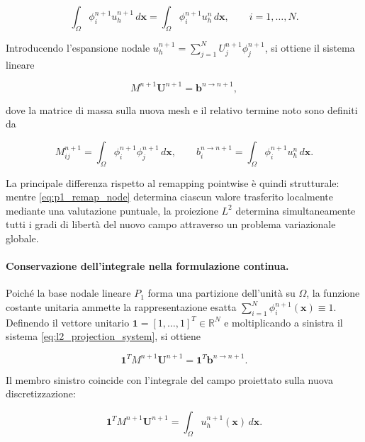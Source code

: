 \begin{equation}
\int_{\Omega}
\phi_i^{n+1}
u_h^{n+1}
\,d\mathbf{x}
=
\int_{\Omega}
\phi_i^{n+1}
u_h^n
\,d\mathbf{x},
\qquad
i=1,\ldots,N.
\label{eq:l2_projection_weak}
\end{equation}

Introducendo l'espansione nodale $u_h^{n+1} = \sum_{j=1}^{N} U_j^{n+1}\phi_j^{n+1}$, si ottiene il sistema lineare

\begin{equation}
M^{n+1}\mathbf{U}^{n+1}
=
\mathbf{b}^{n\rightarrow n+1},
\label{eq:l2_projection_system}
\end{equation}

dove la matrice di massa sulla nuova mesh e il relativo termine noto sono definiti da

\begin{equation}
M_{ij}^{n+1}
=
\int_{\Omega}
\phi_i^{n+1}
\phi_j^{n+1}
\,d\mathbf{x},
\qquad
b_i^{n\rightarrow n+1}
=
\int_{\Omega}
\phi_i^{n+1}
u_h^n
\,d\mathbf{x}.
\label{eq:l2_mass_matrix}
\end{equation}

La principale differenza rispetto al remapping pointwise è quindi strutturale: mentre \eqref{eq:p1_remap_node} determina ciascun valore trasferito localmente mediante una valutazione puntuale, la proiezione $L^2$ determina simultaneamente tutti i gradi di libertà del nuovo campo attraverso un problema variazionale globale.

\paragraph{Conservazione dell'integrale nella formulazione continua.}

Poiché la base nodale lineare $P_1$ forma una partizione dell'unità su $\Omega$, la funzione costante unitaria ammette la rappresentazione esatta $\sum_{i=1}^N \phi_i^{n+1}(\mathbf{x}) \equiv 1$. Definendo il vettore unitario $\mathbf{1}=[1,\ldots,1]^T\in\mathbb{R}^{N}$ e moltiplicando a sinistra il sistema \eqref{eq:l2_projection_system}, si ottiene

\begin{equation}
\mathbf{1}^T M^{n+1}\mathbf{U}^{n+1}
=
\mathbf{1}^T\mathbf{b}^{n\rightarrow n+1}.
\label{eq:l2_integral_identity}
\end{equation}

Il membro sinistro coincide con l'integrale del campo proiettato sulla nuova discretizzazione:

\begin{equation}
\mathbf{1}^T M^{n+1}\mathbf{U}^{n+1}
=
\int_{\Omega}
u_h^{n+1}(\mathbf{x})
\,d\mathbf{x}.
\label{eq:new_integral}
\end{equation}

